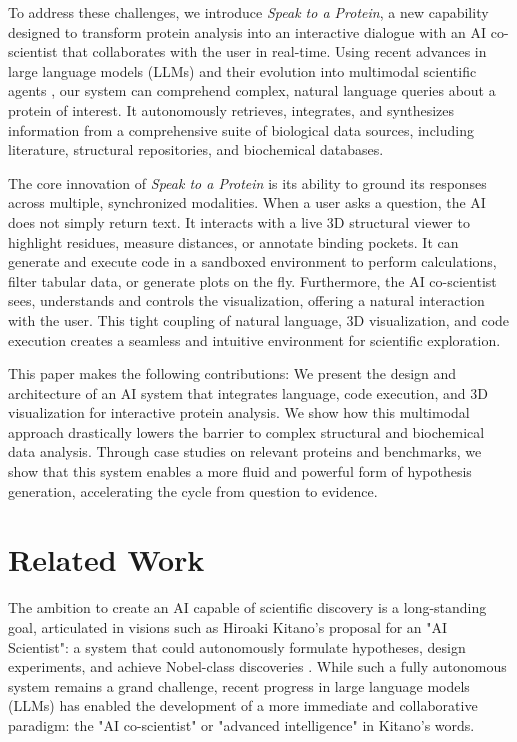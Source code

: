 \documentclass{article}
\begin{document}
To address these challenges, we introduce \emph{Speak to a Protein}, a new capability designed to transform protein analysis into an interactive dialogue with an AI co-scientist that collaborates with the user in real-time. Using recent advances in large language models (LLMs) and their evolution into multimodal scientific agents \citep{Caffagni2024, Zhang2024, Zheng2025}, our system can comprehend complex, natural language queries about a protein of interest. It autonomously retrieves, integrates, and synthesizes information from a comprehensive suite of biological data sources, including literature, structural repositories, and biochemical databases.

The core innovation of \emph{Speak to a Protein} is its ability to ground its responses across multiple, synchronized modalities. When a user asks a question, the AI does not simply return text. It interacts with a live 3D structural viewer to highlight residues, measure distances, or annotate binding pockets. It can generate and execute code in a sandboxed environment to perform calculations, filter tabular data, or generate plots on the fly. Furthermore, the AI co-scientist sees, understands and controls the visualization, offering a natural interaction with the user. This tight coupling of natural language, 3D visualization, and code execution creates a seamless and intuitive environment for scientific exploration.

This paper makes the following contributions: We present the design and architecture of an AI system that integrates language, code execution, and 3D visualization for interactive protein analysis. We show how this multimodal approach drastically lowers the barrier to complex structural and biochemical data analysis. Through case studies on relevant proteins and benchmarks, we show that this system enables a more fluid and powerful form of hypothesis generation, accelerating the cycle from question to evidence.

\section{Related Work}\label{sec:related}
The ambition to create an AI capable of scientific discovery is a long-standing goal, articulated in visions such as Hiroaki Kitano's proposal for an "AI Scientist": a system that could autonomously formulate hypotheses, design experiments, and achieve Nobel-class discoveries \citep{kitano2021}. While such a fully autonomous system \citep{boiko2023autonomous, zou2025agente} remains a grand challenge, recent progress in large language models (LLMs) has enabled the development of a more immediate and collaborative paradigm: the "AI co-scientist" or "advanced intelligence" in Kitano's words.
\end{document}
